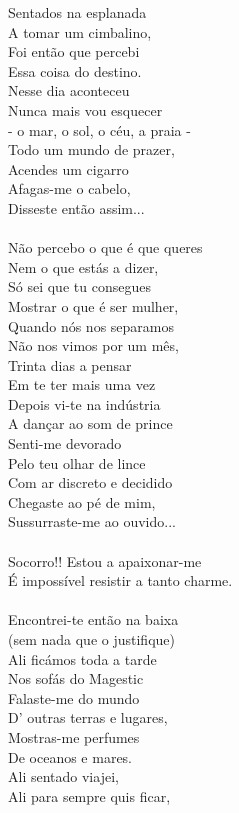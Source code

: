 \documentclass{article}
\begin{document}
Sentados na esplanada\\
A tomar um cimbalino,\\
Foi então que percebi\\
Essa coisa do destino.\\
Nesse dia aconteceu\\
Nunca mais vou esquecer\\
- o mar, o sol, o céu, a praia -\\
Todo um mundo de prazer,\\
Acendes um cigarro\\
Afagas-me o cabelo,\\
Disseste então assim... \\
\\
Não percebo o que é que queres\\
Nem o que estás a dizer,\\
Só sei que tu consegues\\
Mostrar o que é ser mulher,\\
Quando nós nos separamos\\
Não nos vimos por um mês,\\
Trinta dias a pensar\\
Em te ter mais uma vez\\
Depois vi-te na indústria\\
A dançar ao som de prince\\
Senti-me devorado\\
Pelo teu olhar de lince\\
Com ar discreto e decidido\\
Chegaste ao pé de mim,\\
Sussurraste-me ao ouvido... \\
\\
Socorro!! Estou a apaixonar-me\\
É impossível resistir a tanto charme. \\
\\
Encontrei-te então na baixa\\
(sem nada que o justifique)\\
Ali ficámos toda a tarde\\
Nos sofás do Magestic\\
Falaste-me do mundo\\
D' outras terras e lugares,\\
Mostras-me perfumes\\
De oceanos e mares.\\
Ali sentado viajei,\\
Ali para sempre quis ficar,\\
\end{document}
